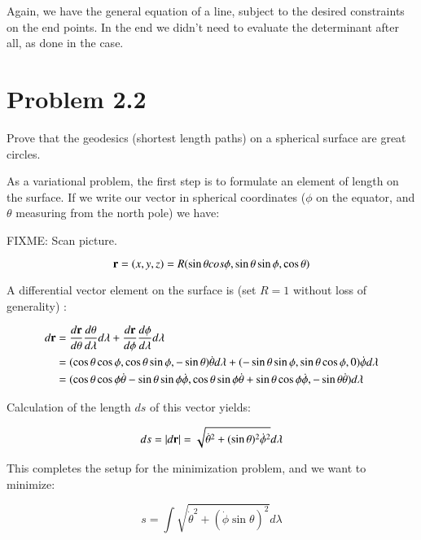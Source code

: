 \documentclass{article}
\newcommand{\Abs}[1]{\left\lvert{#1}\right\rvert}
\newcommand{\dottheta}[0]{\dot{\theta}}
\newcommand{\dotphi}[0]{\dot{\phi}}
\begin{document}
Again, we have the general equation of a line, subject to the desired constraints on the end points.  In the end we didn't need to 
evaluate the determinant after all, as done in the 
 case.

\section{ Problem 2.2 }

Prove that the geodesics (shortest length paths) on a spherical surface are great circles.

As a variational problem, the first step is to formulate an element of length on the surface.  If we write our vector in spherical coordinates ($\phi$ on the equator, and $\theta$ measuring from the north pole) we have:

FIXME: Scan picture.

\begin{equation*}
\mathbf{r} = (x, y, z) = R( \sin\theta cos\phi, \sin\theta \sin\phi, \cos\theta)
\end{equation*}

A differential vector element on the surface is (set $R=1$ without loss of generality) :

\begin{align*}
d \Br 
&= \frac{d\Br}{d \theta} \frac{d \theta}{d \lambda} d \lambda + \frac{d\Br}{d \phi} \frac{d \phi}{d \lambda} d \lambda \\
&=
 ( \cos\theta \cos\phi, \cos\theta \sin\phi, -\sin\theta) \dottheta d\lambda
+( -\sin\theta \sin\phi, \sin\theta \cos\phi, 0) \dotphi d\lambda \\
&=
 ( \cos\theta \cos\phi \dottheta - \sin\theta \sin\phi \dotphi,
   \cos\theta \sin\phi \dottheta + \sin\theta \cos\phi \dotphi,
  -\sin\theta \dottheta) d\lambda
\end{align*}

Calculation of the length $ds$ of this vector yields:

\begin{equation*}
ds = \Abs{ d\Br} = \sqrt{\dottheta^2 + (\sin\theta)^2 \dotphi^2} d\lambda
\end{equation*}

This completes the setup for the minimization problem, and we want to 
minimize:

\begin{equation*}
s = \int \sqrt{\dottheta^2 + ( \dotphi \sin\theta )^2 } d\lambda
\end{equation*}
\end{document}
